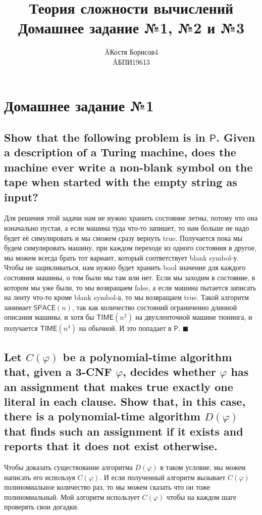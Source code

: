 \documentclass{article}
\title{Теория сложности вычислений \\ Домашнее задание №1, №2 и №3}
\author{\AA{Костя Борисов}{4} \\ \AA{БПИ196}{13}}
\let\temp\phi
\let\phi\varphi
\let\varphi\temp
\begin{document}
  \maketitle

  \section{Домашнее задание №1}
  \setcounter{subsection}{9}
  \subsection{Show that the following problem is in $\mathsf{P}$. Given a description of a Turing machine, does the machine ever write a non-blank symbol on the tape when started with the empty string as input?}
  Для решения этой задачи нам не нужно хранить состояние летны, потому что она изначально пустая,
  а если машина туда что-то запишет, то нам больше не надо будет её симулировать и мы сможем сразу вернуть true.
  Получается пока мы будем симулировать машину, при каждом переходе из одного состояния в другое,
  мы можем всегда брать тот вариант, который соответствует blank symbol-у.
  Чтобы не зацикливаться, нам нужно будет хранить bool значение для каждого состояния машины, о том были мы там или нет.
  Если мы заходим в состояние, в котором мы уже были, то мы возвращаем false,
  а если машина пытается записать на ленту что-то кроме blank symbol-а, то мы возвращаем true.
  Такой алгоритм занимает $\mathsf{SPACE}(n)$, так как количество состояний ограниченно длинной описания машины,
  и хотя бы $\mathsf{TIME}(n^2)$ на двухленточной машине тюнинга, и получается $\mathsf{TIME}(n^4)$ на обычной.
  И это попадает в $\mathsf{P}$.
  $\blacksquare$

  \subsection{Let $C(\phi)$ be a polynomial-time algorithm that, given a 3-CNF $\phi$, decides whether $\phi$ has an assignment that makes true exactly one literal in each clause. Show that, in this case, there is a polynomial-time algorithm $D(\phi)$ that finds such an assignment if it exists and reports that it does not exist otherwise.}
  Чтобы доказать существование алгоритма $D(\phi)$ в таком условие, мы можем написать его используя $C(\phi)$.
  И если полученный алгоритм вызывает $C(\phi)$ полиномиальное количество раз, то мы можем сказать что он тоже полиномиальный.
  Мой алгоритм использует $C(\phi)$ чтобы на каждом шаге проверять свои догадки.
\end{document}
